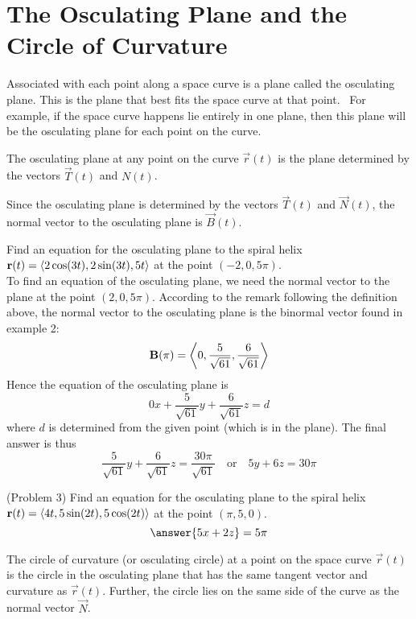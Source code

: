 \documentclass[handout]{ximera}
\begin{document}
\section{The Osculating Plane and the Circle of Curvature}

Associated with each point along a space curve is a plane called the osculating plane.  This is the plane that best fits the space curve at that point.  \
For example, if the space curve happens lie entirely in one plane, then this plane will be the osculating plane for each point on the curve.

\begin{definition}
The osculating plane at any point on the curve $\vec r(t)$ is the plane determined by the vectors $\vec T(t)$ and $N(t)$.
\end{definition}

\begin{remark}
Since the osculating plane is determined by the vectors $\vec T(t)$ and $\vec N(t)$, the normal vector to the osculating plane is $\vec B(t)$.
\end{remark}

\begin{example}[Example 3]
Find an equation for the osculating plane to the spiral helix $\mathbf r(t) =  \left\langle 2\cos(3t), 2\sin(3t), 5t\right\rangle$ at the point $(-2, 0, 5\pi)$.\\
To find an equation of the osculating plane, we need the normal vector to the plane at the point $(2, 0, 5\pi)$.
According to the remark following the definition above, the normal vector to the osculating plane is the binormal vector found in example 2:
\[
\mathbf B(\pi) =   \left\langle 0, \frac{5}{\sqrt {61}}, \frac{6}{\sqrt{61}}\right\rangle
\]
Hence the equation of the osculating plane is
\[
0x + \frac{5}{\sqrt {61}}y +\frac{6}{\sqrt{61}}z = d
\]
where $d$ is determined from the given point (which is in the plane).
The final answer is thus
\[
\frac{5}{\sqrt {61}}y +\frac{6}{\sqrt{61}}z = \frac{30\pi}{\sqrt{61}} \quad \text{or} \quad 5y+6z = 30\pi
\]
\end{example}

\begin{problem}(Problem 3)
Find an equation for the osculating plane to the spiral helix $\mathbf r(t) = \left\langle 4t, 5 \sin(2t),5\cos(2t)\right\rangle$ at the point $(\pi, 5, 0)$.\\
\[
\answer{5x + 2z } = 5\pi
\]
\end{problem}

\begin{definition}
The circle of curvature (or osculating circle) at a point on the space curve $\vec r(t)$ is the circle in 
the osculating plane that has the same tangent vector and curvature as $\vec r(t)$.  
Further, the circle lies on the same side of the curve as the normal vector $\vec N$.
\end{definition}
\end{document}
